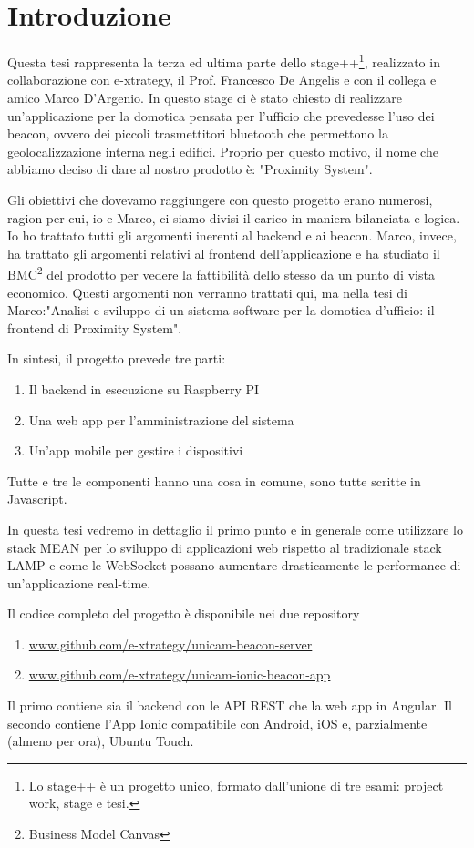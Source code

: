 \chapter{Introduzione}
\label{chap:intro}

Questa tesi rappresenta la terza ed ultima parte dello stage++\footnote{Lo stage++ è un progetto unico, formato dall'unione di tre esami: project work, stage e tesi.},
realizzato in collaborazione con e-xtrategy, il Prof. Francesco De Angelis e con il collega e amico Marco D'Argenio.
In questo stage ci è stato chiesto di realizzare un'applicazione per la domotica pensata per l'ufficio che prevedesse l'uso dei beacon, ovvero dei piccoli trasmettitori bluetooth che permettono la geolocalizzazione interna negli edifici. 
Proprio per questo motivo, il nome che abbiamo deciso di dare al nostro prodotto è: "Proximity System".

Gli obiettivi che dovevamo raggiungere con questo progetto erano numerosi, ragion per cui, io e Marco, ci siamo divisi il carico in maniera bilanciata e logica.
Io ho trattato tutti gli argomenti inerenti al backend e ai beacon. 
Marco, invece, ha trattato gli argomenti relativi al frontend dell'applicazione e ha studiato il BMC\footnote{Business Model Canvas} del prodotto per vedere la fattibilità dello stesso da un punto di vista economico. 
Questi argomenti non verranno trattati qui, ma nella tesi di Marco:"Analisi e sviluppo di un sistema software per la domotica d'ufficio: il frontend di Proximity System".

In sintesi, il progetto prevede tre parti: 
\begin{enumerate}
\item Il backend in esecuzione su Raspberry PI
\item Una web app per l'amministrazione del sistema
\item Un'app mobile per gestire i dispositivi
\end{enumerate}
Tutte e tre le componenti hanno una cosa in comune, sono tutte scritte in Javascript.

In questa tesi vedremo in dettaglio il primo punto e in generale come utilizzare lo stack MEAN per lo sviluppo di applicazioni web rispetto al tradizionale stack LAMP e come le WebSocket possano aumentare drasticamente le performance di un'applicazione real-time.

Il codice completo del progetto è disponibile nei due repository
\begin{enumerate}
\item \url{www.github.com/e-xtrategy/unicam-beacon-server}
\item \url{www.github.com/e-xtrategy/unicam-ionic-beacon-app}
\end{enumerate} 
Il primo contiene sia il backend con le API REST che la web app in Angular.
Il secondo contiene l'App Ionic compatibile con Android, iOS e, parzialmente (almeno per ora), Ubuntu Touch. 

